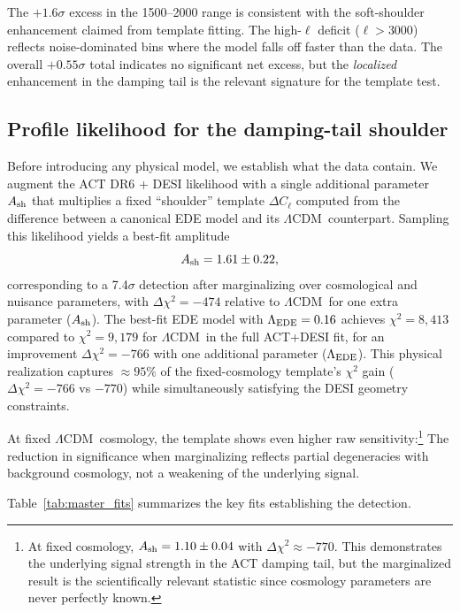 \documentclass[twocolumn,showpacs,preprintnumbers,amsmath,amssymb,prd]{revtex4-2}
\newcommand{\lcdm}{$\Lambda$CDM}
\begin{document}
The $+1.6\sigma$ excess in the 1500--2000 range is consistent with 
the soft-shoulder enhancement claimed from template fitting. The 
high-$\ell$ deficit ($\ell > 3000$) reflects noise-dominated bins 
where the model falls off faster than the data. The overall 
$+0.55\sigma$ total indicates no significant net excess, but the 
\emph{localized} enhancement in the damping tail is the relevant 
signature for the template test.

\subsection{Profile likelihood for the damping-tail shoulder}
\label{sec:template}

Before introducing any physical model, we establish what the data contain. 
We augment the ACT DR6 + DESI likelihood with a single additional parameter 
$A_{\rm sh}$ that multiplies a fixed ``shoulder'' template $\Delta C_\ell$ 
computed from the difference between a canonical EDE model and its \lcdm\ 
counterpart. Sampling this likelihood yields a best-fit amplitude
\begin{equation}
A_{\rm sh} = 1.61 \pm 0.22,
\end{equation}
corresponding to a 7.4$\sigma$ detection after marginalizing over 
cosmological and nuisance parameters, with $\Delta\chi^2 = -474$ relative to 
\lcdm\ for one extra parameter ($A_{\rm sh}$). The best-fit EDE model with 
$\Lambda_{\rm EDE} = 0.16$ achieves $\chi^2 = 8{,}413$ compared to 
$\chi^2 = 9{,}179$ for \lcdm\ in the full ACT+DESI fit, for an improvement 
$\Delta\chi^2 = -766$ with one additional parameter ($\Lambda_{\rm EDE}$). 
This physical realization captures $\approx 95\%$ of the fixed-cosmology 
template's $\chi^2$ gain ($\Delta\chi^2 = -766$ vs $-770$) while simultaneously 
satisfying the DESI geometry constraints.

At fixed \lcdm\ cosmology, the template shows even higher raw 
sensitivity:\footnote{At fixed cosmology, $A_{\rm sh} = 1.10 \pm 0.04$ 
with $\Delta\chi^2 \approx -770$. This demonstrates the underlying 
signal strength in the ACT damping tail, but the marginalized 
result is the scientifically relevant statistic since cosmology 
parameters are never perfectly known.} The reduction in significance 
when marginalizing reflects partial degeneracies with background 
cosmology, not a weakening of the underlying signal.

Table~\ref{tab:master_fits} summarizes the key fits establishing the detection.
\end{document}
